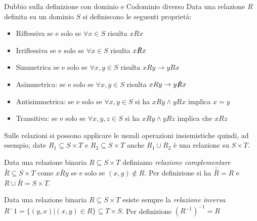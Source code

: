 Dubbio sulla definizione con dominio e Codominio diverso
Data una relazione $R$ definita su un dominio $S$ si definiscono le seguenti proprietà:
\begin{itemize}
  \item Riflessiva se e solo se $\forall x \in S$ risulta  $xRx$
  \item Irriflessiva se e solo se $\forall x \in S$ risulta $x \slashed{R} x$
  \item Simmetrica se e solo se $\forall x,y \in S$ risulta $xRy \rightarrow yRx$
  \item Asimmetrica: se e solo se $\forall x,y \in S$ risulta $xRy \rightarrow y \slashed{R} x$
  \item Antisimmetrica: se e solo se $\forall x,y \in S$ si ha $xRy \land yRx$ implica $x = y$
  \item Transitiva: se e solo se $\forall x,y,z \in S$ si ha $xRy \land yRz$ implica che $xRz$
\end{itemize}




Sulle relazioni si possono applicare le usuali operazioni insiemistiche quindi, ad esempio,
date $R_1 \subseteq S \times T$ e $R_2 \subseteq S \times T$ anche $R_1 \cup R_2$ è una relazione su $S \times T$.

Data una relazione binaria $R \subseteq S \times T$ definiamo \emph{relazione complementare}
$\bar{R} \subseteq S \times T$ come $x \bar{R} y$ se e solo se $(x,y) \not \in R$.
Per definizione si ha $\bar{\bar{R}} = R$ e $R \cup \bar{R} = S \times T$.

Data una relazione binaria $R \subseteq S \times T$ esiste sempre la \emph{relazione inversa}
$R^-1 = \{(y,x) | (x,y) \in R\} \subseteq T \times S$.
Per definizione $(R ^ {-1}) ^ {-1} = R$
